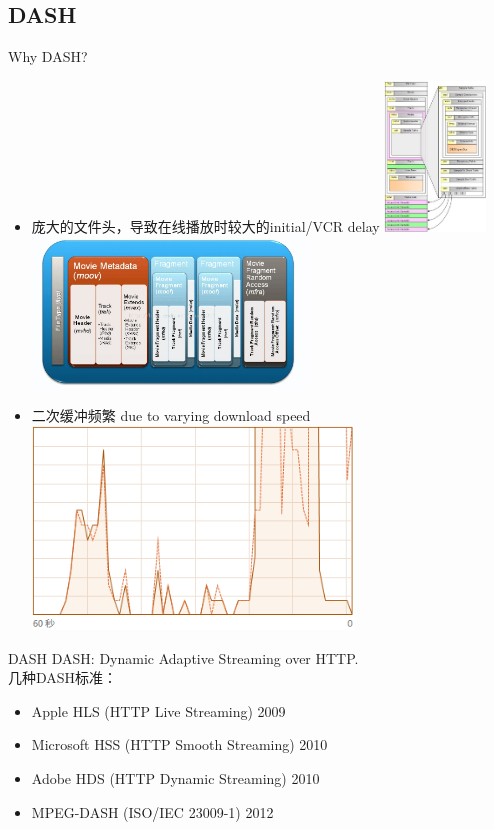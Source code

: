 \documentclass{beamer}
\begin{document}
\subsection{DASH}
\begin{frame}{Why DASH?}
\pause
\begin{itemize}
\item 庞大的文件头，导致在线播放时较大的initial/VCR delay
\includegraphics[height=4cm]{fig/MP4_boxes_detail.jpg}
\includegraphics[height=4cm]{fig/fragmented_mp4.jpg}
\end{itemize}
\end{frame}
\begin{frame}
\begin{itemize}
\item 二次缓冲频繁 due to varying download speed \\
\includegraphics[height=5.4cm]{fig/download_speed.png}
\end{itemize}
\end{frame}
\begin{frame}{DASH}
DASH: Dynamic Adaptive Streaming over HTTP. \\
几种DASH标准：
\pause
\begin{itemize}
\item Apple HLS (HTTP Live Streaming) 2009
\item Microsoft HSS (HTTP Smooth Streaming) 2010
\item Adobe HDS (HTTP Dynamic Streaming) 2010
\item MPEG-DASH (ISO/IEC 23009-1) 2012
\end{itemize}
\end{frame}
\end{document}
